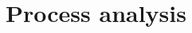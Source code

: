 \documentclass[../main.tex]{subfiles}
\begin{document}
    \chapter{Process analysis}\label{ch:process-analysis}

    
    
    
    
    
    
    
\end{document}

